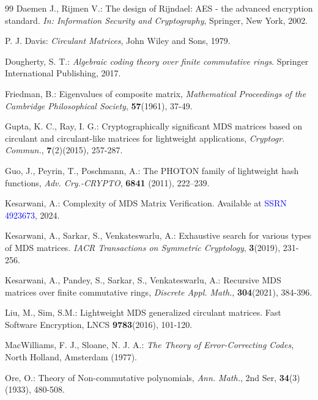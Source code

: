 \documentclass[12pt]{article}
\begin{document}
\begin{thebibliography}{99}
 Daemen J., Rijmen V.: The design of Rijndael: AES - the advanced encryption standard. \textit{In: Information
	Security and Cryptography}, Springer, New York, 2002.
	
	  P. J. Davis: \textit{Circulant Matrices}, John Wiley and Sons, 1979.
	
	
	Dougherty, S. T.: \textit{Algebraic coding theory over finite commutative rings}. Springer International Publishing, 2017.
	
	
	   Friedman, B.: Eigenvalues of composite matrix, \textit{Mathematical Proceedings of the Cambridge Philosophical Society}, \textbf{57}(1961), 37-49.

 Gupta, K. C., Ray, I. G.: Cryptographically significant MDS matrices
based on circulant and circulant-like matrices for lightweight applications, \textit{Cryptogr. Commun.}, \textbf{7}(2)(2015), 257-287.


 Guo, J.,   Peyrin, T., Poschmann, A.: The PHOTON family of lightweight hash functions, \textit{Adv. Cry.-CRYPTO}, \textbf{6841} (2011), 222--239.

 Kesarwani, A.: Complexity of MDS Matrix Verification. Available at \textcolor{blue}{SSRN 4923673}, 2024.


Kesarwani, A., Sarkar, S., Venkateswarlu, A.: Exhaustive search for various types of MDS matrices. \textit{IACR Transactions on Symmetric Cryptology}, \textbf{3}(2019), 231-256.

Kesarwani, A., Pandey, S., Sarkar, S.,  Venkateswarlu, A.: Recursive MDS matrices over finite commutative rings, \textit{Discrete Appl. Math.}, \textbf{304}(2021), 384-396.












  Liu, M., Sim, S.M.: Lightweight MDS generalized circulant matrices. Fast Software Encryption, LNCS
\textbf{9783}(2016), 101-120. 

 MacWilliams, F. J., Sloane, N. J. A.: \textit{The Theory of Error-Correcting Codes}, North Holland, Amsterdam
(1977).

 Ore, O.: Theory of Non-commutative polynomials,  \textit{Ann. Math.}, 2nd Ser, \textbf{34}(3)(1933), 480-508.



\end{thebibliography}
\end{document}
